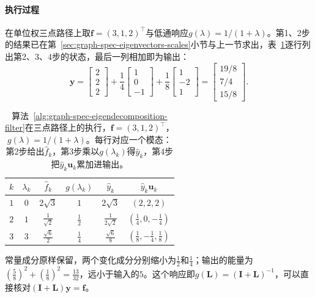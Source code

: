 \paragraph{执行过程}
在单位权三点路径上取$\bm f=(3,1,2)^{\top}$与低通响应$g(\lambda)=1/(1+\lambda)$。第1、2步的结果已在第~\ref{sec:graph-spec-eigenvectors-scales}小节与上一节求出，表~\ref{tab:graph-spec-eigen-filter-trace}逐行列出第2、3、4步的状态，最后一列相加即为输出：
\[
 \bm y=\begin{bmatrix}2\\2\\2\end{bmatrix}+\frac14\begin{bmatrix}1\\0\\-1\end{bmatrix}+\frac18\begin{bmatrix}1\\-2\\1\end{bmatrix}
 =\begin{bmatrix}19/8\\7/4\\15/8\end{bmatrix}.
\]

\begin{table}[!htb]
  \centering
  \caption{算法~\ref{alg:graph-spec-eigendecomposition-filter}在三点路径上的执行，$\bm f=(3,1,2)^{\top}$，$g(\lambda)=1/(1+\lambda)$。每行对应一个模态：第2步给出$\widehat f_k$，第3步乘以$g(\lambda_k)$得$\widehat y_k$，第4步把$\widehat y_k\bm u_k$累加进输出。}
  \label{tab:graph-spec-eigen-filter-trace}
  \small
  \begin{tabular}{@{}cccccc@{}}
    \toprule
    $k$ & $\lambda_k$ & $\widehat f_k$ & $g(\lambda_k)$ & $\widehat y_k$ & $\widehat y_k\bm u_k$ \\
    \midrule
    $1$ & $0$ & $2\sqrt3$ & $1$ & $2\sqrt3$ & $(2,2,2)$ \\
    $2$ & $1$ & $\tfrac1{\sqrt2}$ & $\tfrac12$ & $\tfrac1{2\sqrt2}$ & $(\tfrac14,0,-\tfrac14)$ \\
    $3$ & $3$ & $\tfrac{\sqrt6}2$ & $\tfrac14$ & $\tfrac{\sqrt6}8$ & $(\tfrac18,-\tfrac14,\tfrac18)$ \\
    \bottomrule
  \end{tabular}
\end{table}

常量成分原样保留，两个变化成分分别缩小为$\tfrac12$和$\tfrac14$；输出的能量为$(\tfrac58)^2+(\tfrac18)^2=\tfrac{13}{32}$，远小于输入的$5$。这个响应即$g(\bm L)=(\bm I+\bm L)^{-1}$，可以直接核对$(\bm I+\bm L)\bm y=\bm f$。

